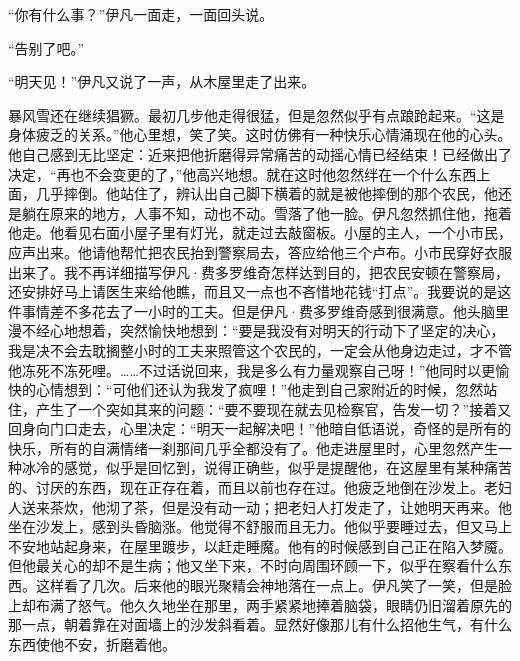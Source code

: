 \par “你有什么事？”伊凡一面走，一面回头说。
\par “告别了吧。”
\par “明天见！”伊凡又说了一声，从木屋里走了出来。
\par 暴风雪还在继续猖獗。最初几步他走得很猛，但是忽然似乎有点踉跄起来。“这是身体疲乏的关系。”他心里想，笑了笑。这时仿佛有一种快乐心情涌现在他的心头。他自己感到无比坚定：近来把他折磨得异常痛苦的动摇心情已经结束！已经做出了决定，“再也不会变更的了，”他高兴地想。就在这时他忽然绊在一个什么东西上面，几乎摔倒。他站住了，辨认出自己脚下横着的就是被他摔倒的那个农民，他还是躺在原来的地方，人事不知，动也不动。雪落了他一脸。伊凡忽然抓住他，拖着他走。他看见右面小屋子里有灯光，就走过去敲窗板。小屋的主人，一个小市民，应声出来。他请他帮忙把农民抬到警察局去，答应给他三个卢布。小市民穿好衣服出来了。我不再详细描写伊凡·费多罗维奇怎样达到目的，把农民安顿在警察局，还安排好马上请医生来给他瞧，而且又一点也不吝惜地花钱“打点”。我要说的是这件事情差不多花去了一小时的工夫。但是伊凡·费多罗维奇感到很满意。他头脑里漫不经心地想着，突然愉快地想到：“要是我没有对明天的行动下了坚定的决心，我是决不会去耽搁整小时的工夫来照管这个农民的，一定会从他身边走过，才不管他冻死不冻死哩。……不过话说回来，我是多么有力量观察自己呀！”他同时以更愉快的心情想到：“可他们还认为我发了疯哩！”他走到自己家附近的时候，忽然站住，产生了一个突如其来的问题：“要不要现在就去见检察官，告发一切？”接着又回身向门口走去，心里决定：“明天一起解决吧！”他暗自低语说，奇怪的是所有的快乐，所有的自满情绪一刹那间几乎全都没有了。他走进屋里时，心里忽然产生一种冰冷的感觉，似乎是回忆到，说得正确些，似乎是提醒他，在这屋里有某种痛苦的、讨厌的东西，现在正存在着，而且以前也存在过。他疲乏地倒在沙发上。老妇人送来茶炊，他沏了茶，但是没有动一动；把老妇人打发走了，让她明天再来。他坐在沙发上，感到头昏脑涨。他觉得不舒服而且无力。他似乎要睡过去，但又马上不安地站起身来，在屋里踱步，以赶走睡魔。他有的时候感到自己正在陷入梦魇。但他最关心的却不是生病；他又坐下来，不时向周围环顾一下，似乎在察看什么东西。这样看了几次。后来他的眼光聚精会神地落在一点上。伊凡笑了一笑，但是脸上却布满了怒气。他久久地坐在那里，两手紧紧地捧着脑袋，眼睛仍旧溜着原先的那一点，朝着靠在对面墙上的沙发斜看着。显然好像那儿有什么招他生气，有什么东西使他不安，折磨着他。
